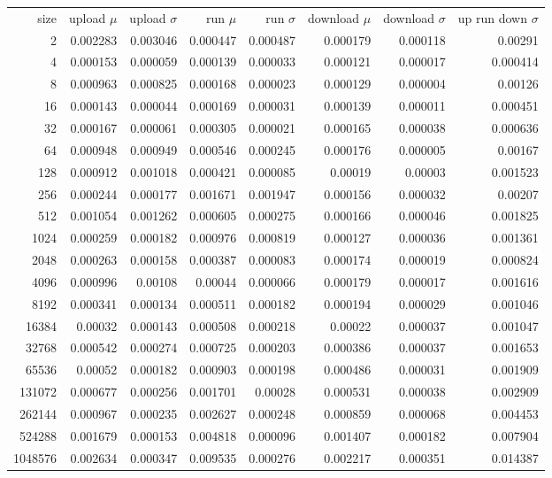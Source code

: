 \begin{tabular}{r r r r r r r r}
size & upload $\mu$  & upload $\sigma$ & run $\mu$ & run $\sigma$ & download $\mu$ & download $\sigma$ & up run down $\sigma$ \\
2 & 0.002283 & 0.003046 & 0.000447 & 0.000487 & 0.000179 & 0.000118 & 0.00291 \\
4 & 0.000153 & 0.000059 & 0.000139 & 0.000033 & 0.000121 & 0.000017 & 0.000414 \\
8 & 0.000963 & 0.000825 & 0.000168 & 0.000023 & 0.000129 & 0.000004 & 0.00126 \\
16 & 0.000143 & 0.000044 & 0.000169 & 0.000031 & 0.000139 & 0.000011 & 0.000451 \\
32 & 0.000167 & 0.000061 & 0.000305 & 0.000021 & 0.000165 & 0.000038 & 0.000636 \\
64 & 0.000948 & 0.000949 & 0.000546 & 0.000245 & 0.000176 & 0.000005 & 0.00167 \\
128 & 0.000912 & 0.001018 & 0.000421 & 0.000085 & 0.00019 & 0.00003 & 0.001523 \\
256 & 0.000244 & 0.000177 & 0.001671 & 0.001947 & 0.000156 & 0.000032 & 0.00207 \\
512 & 0.001054 & 0.001262 & 0.000605 & 0.000275 & 0.000166 & 0.000046 & 0.001825 \\
1024 & 0.000259 & 0.000182 & 0.000976 & 0.000819 & 0.000127 & 0.000036 & 0.001361 \\
2048 & 0.000263 & 0.000158 & 0.000387 & 0.000083 & 0.000174 & 0.000019 & 0.000824 \\
4096 & 0.000996 & 0.00108 & 0.00044 & 0.000066 & 0.000179 & 0.000017 & 0.001616 \\
8192 & 0.000341 & 0.000134 & 0.000511 & 0.000182 & 0.000194 & 0.000029 & 0.001046 \\
16384 & 0.00032 & 0.000143 & 0.000508 & 0.000218 & 0.00022 & 0.000037 & 0.001047 \\
32768 & 0.000542 & 0.000274 & 0.000725 & 0.000203 & 0.000386 & 0.000037 & 0.001653 \\
65536 & 0.00052 & 0.000182 & 0.000903 & 0.000198 & 0.000486 & 0.000031 & 0.001909 \\
131072 & 0.000677 & 0.000256 & 0.001701 & 0.00028 & 0.000531 & 0.000038 & 0.002909 \\
262144 & 0.000967 & 0.000235 & 0.002627 & 0.000248 & 0.000859 & 0.000068 & 0.004453 \\
524288 & 0.001679 & 0.000153 & 0.004818 & 0.000096 & 0.001407 & 0.000182 & 0.007904 \\
1048576 & 0.002634 & 0.000347 & 0.009535 & 0.000276 & 0.002217 & 0.000351 & 0.014387 \\

\end{tabular}
